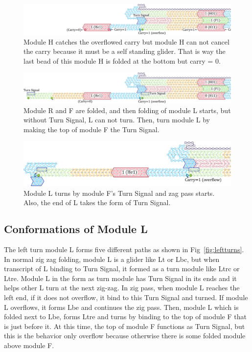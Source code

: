 \documentclass[runningheads]{llncs}
\begin{document}
\begin{figure}[tb]
\centering
\includegraphics[width=\linewidth]{fig/svg/CounterEx15_1.pdf}
\caption{
Module H catches the overflowed carry but module H can not cancel the carry because it must be a self standing glider.
That is way the last bead of this module H is folded at the bottom but carry = 0. 
}
\label{fig:overflowex3}
\end{figure}

\begin{figure}[tb]
\centering
\includegraphics[width=\linewidth]{fig/svg/CounterEx17_1.pdf}
\caption{
Module R and F are folded, and then folding of module L starts, but without Turn Signal, L can not turn.
Then, turn module L by making the top of module F the Turn Signal.
}
\label{fig:overflowex4}
\end{figure}

\begin{figure}[tb]
\centering
\includegraphics[width=\linewidth]{fig/svg/CounterEx18_1.pdf}
\caption{
Module L turns by module F's Turn Signal and zag pass starts.
Also, the end of L takes the form of Turn Signal.
}
\label{fig:overflowex5}
\end{figure}

\subsection{Conformations of Module L}
The left turn module L forms five different paths as shown in Fig~\ref{fig:leftturns}.
In normal zig zag folding, module L is a glider like Lt or Lbc, but when transcript of L binding to Turn Signal, it formed as a turn module like Ltrc or Ltre.
Module L in the form as turn module has Turn Signal in its ends and it helps other L turn at the next zig-zag.
In zig pass, when module L reaches the left end, if it does not overflow, it bind to this Turn Signal and turned.
If module L overflows, it forms Lbe and continues the zig pass.
Then, module L which is folded next to Lbe, forms Ltre and turns by binding to the top of module F that is just before it.
At this time, the top of module F functions as Turn Signal, but this is the behavior only overflow because otherwise there is some folded module above module F.
\end{document}
